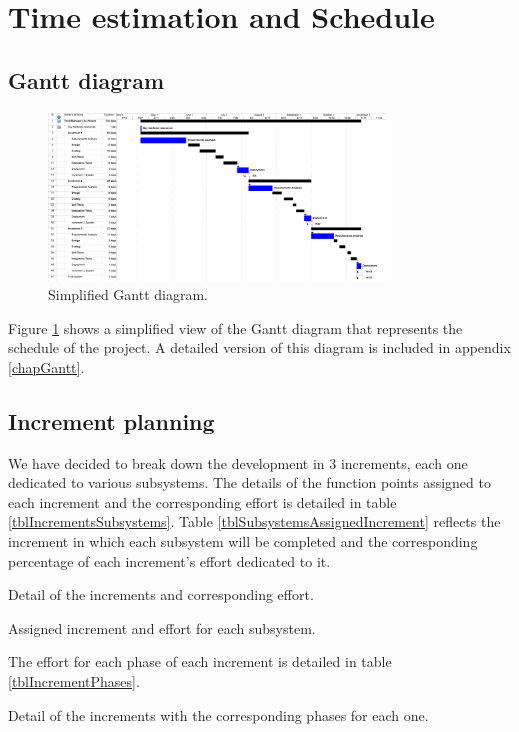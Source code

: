 \section{Time estimation and Schedule}
\label{secTimeEstimation}
\subsection{Gantt diagram}

\begin{figure}[hbtp]
\centering
\includegraphics[width=0.8\textwidth]{img/GanttDiagram.png}
\caption{Simplified Gantt diagram.}
\label{figGanttSimple}
\end{figure}

Figure \ref{figGanttSimple} shows a simplified view of the Gantt diagram that represents the schedule of the project. A detailed version of this diagram is included in appendix \ref{chapGantt}.

\subsection{Increment planning}

We have decided to break down the development in 3 increments, each one dedicated to various subsystems. The details of the function points assigned to each increment and the corresponding effort is detailed in table \ref{tblIncrementsSubsystems}. Table \ref{tblSubsystemsAssignedIncrement} reflects the increment in which each subsystem will be completed and the corresponding percentage of each increment's effort dedicated to it.

\begin{table}[hbtp]
\centering

\caption{Detail of the increments and corresponding effort.}
\label{tblIncrementsSubsystems}
\end{table}

\begin{table}[hbtp]
\centering

\caption{Assigned increment and effort for each subsystem.}
\label{tblSubsystemsAssignedIncrement}
\end{table}

The effort for each phase of each increment is detailed in table \ref{tblIncrementPhases}.

\begin{table}[hbtp]
\centering

\caption{Detail of the increments with the corresponding phases for each one.}
\label{tblIncrementPhases}
\end{table}

